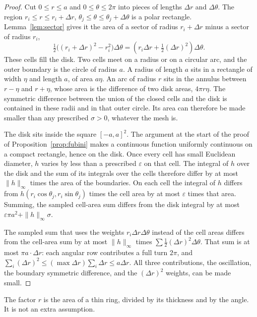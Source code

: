 \begin{proof}
Cut $0\le r\le a$ and $0\le\theta\le 2\pi$ into pieces of lengths $\Delta r$ and $\Delta\theta$. The region $r_i\le r\le r_i+\Delta r$, $\theta_j\le\theta\le\theta_j+\Delta\theta$ is a polar rectangle. Lemma~\ref{lem:sector} gives it the area of a sector of radius $r_i+\Delta r$ minus a sector of radius $r_i$,
\[
 \tfrac12\bigl((r_i+\Delta r)^2-r_i^2\bigr)\Delta\theta=(r_i\Delta r+\tfrac12(\Delta r)^2)\Delta\theta.
\]
These cells fill the disk. Two cells meet on a radius or on a circular arc, and the outer boundary is the circle of radius $a$. A radius of length $a$ sits in a rectangle of width $\eta$ and length $a$, of area $a\eta$. An arc of radius $r$ sits in the annulus between $r-\eta$ and $r+\eta$, whose area is the difference of two disk areas, $4\pi r\eta$. The symmetric difference between the union of the closed cells and the disk is contained in these radii and in that outer circle. Its area can therefore be made smaller than any prescribed $\sigma>0$, whatever the mesh is.

The disk sits inside the square $[-a,a]^2$. The argument at the start of the proof of Proposition~\ref{prop:fubini} makes a continuous function uniformly continuous on a compact rectangle, hence on the disk. Once every cell has small Euclidean diameter, $h$ varies by less than a prescribed $\varepsilon$ on that cell. The integral of $h$ over the disk and the sum of its integrals over the cells therefore differ by at most $\|h\|_\infty$ times the area of the boundaries. On each cell the integral of $h$ differs from $h(r_i\cos\theta_j,r_i\sin\theta_j)$ times the cell area by at most $\varepsilon$ times that area. Summing, the sampled cell-area sum differs from the disk integral by at most $\varepsilon\pi a^2+\|h\|_\infty\sigma$.

The sampled sum that uses the weights $r_i\Delta r\Delta\theta$ instead of the cell areas differs from the cell-area sum by at most $\|h\|_\infty$ times $\sum\tfrac12(\Delta r)^2\Delta\theta$. That sum is at most $\pi a\cdot\Delta r$: each angular row contributes a full turn $2\pi$, and $\sum_i(\Delta r)^2\le(\max\Delta r)\sum_i\Delta r\le a\Delta r$. All three contributions, the oscillation, the boundary symmetric difference, and the $(\Delta r)^2$ weights, can be made small.
\end{proof}

The factor $r$ is the area of a thin ring, divided by its thickness and by the angle. It is not an extra assumption.

